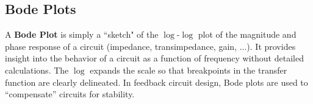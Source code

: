 \subsection{Bode Plots}
A \textbf{Bode Plot} is simply a ``sketch" of the $\log$-$\log$ plot of the magnitude and phase response of a circuit (impedance, transimpedance, gain, ...).  It provides insight into the behavior of a circuit as a function of frequency without detailed calculations.  The $\log$ expands the scale so that breakpoints in the transfer function are clearly delineated.  In feedback circuit design, Bode plots are used to “compensate” circuits for stability.
